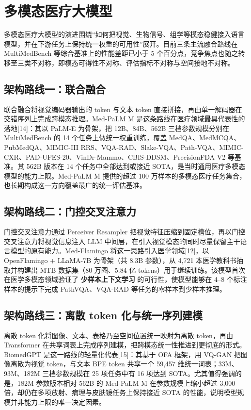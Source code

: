 \section{多模态医疗大模型}

多模态医疗大模型的演进围绕“如何把视觉、生物信号、组学等模态稳健接入语言模型，并在下游任务上保持统一权重的可用性”展开。目前三条主流融合路线在 MultiMedBench 等综合基准上的性能差距已小于 5 个百分点，竞争焦点也随之转移至三类不对称，即模态可得性不对称、评估指标不对称与空间接地不对称。

\subsection{架构路线一：联合融合}

联合融合将视觉编码器输出的 token 与文本 token 直接拼接，再由单一解码器在交错序列上完成跨模态推理。Med-PaLM M 是这条路线在医疗领域最具代表性的落地[14]：其以 PaLM-E 为骨架，把 12B、84B、562B 三档参数规模分别在 MultiMedBench 的 14 个任务上做统一权重训练，覆盖 MedQA、MedMCQA、PubMedQA、MIMIC-III RRS、VQA-RAD、Slake-VQA、Path-VQA、MIMIC-CXR、PAD-UFES-20、VinDr-Mammo、CBIS-DDSM、PrecisionFDA V2 等基准。其 562B 版本在 14 个任务中全部达到或接近 SOTA，是当时通用医疗多模态模型的能力上限。Med-PaLM M 提供的超过 100 万样本的多模态医疗任务集合，也长期构成这一方向覆盖最广的统一评估基准。

\subsection{架构路线二：门控交叉注意力}

门控交叉注意力通过 Perceiver Resampler 把视觉特征压缩到固定槽位，再以门控交叉注意力将视觉信息注入 LLM 中间层，在引入视觉模态的同时尽量保留主干语言模型的原有能力。Med-Flamingo 将这一思路引入医学领域[12]，以 OpenFlamingo + LLaMA-7B 为骨架（共 8.3B 参数），从 4,721 本医学教科书抽取并构建出 MTB 数据集（80 万图、5.84 亿 tokens）用于继续训练。该模型首次在医学多模态领域验证了 \textbf{少样本上下文学习} 的可行性，使模型能够在 4--8 个标注样本的提示下完成 PathVQA、VQA-RAD 等任务的零样本到少样本推理。

\subsection{架构路线三：离散 token 化与统一序列建模}

离散 token 化将图像、文本、表格乃至空间位置统一映射为离散 token，再由 Transformer 在共享词表上完成序列建模，把跨模态统一性推进到更彻底的形式。BiomedGPT 是这一路线的轻量化代表[15]：其基于 OFA 框架，用 VQ-GAN 把图像离散为视觉 token，与文本 BPE token 共享一个 59,457 维统一词表；33M、93M、182M 三档参数规模在 25 项任务中有 16 项达到 SOTA。尤其值得强调的是，182M 参数版本相对 562B 的 Med-PaLM M 在参数规模上缩小超过 3,000 倍，却仍在多项放射、病理与皮肤镜任务上保持接近 SOTA 的性能，说明模型规模并非能力上限的唯一决定因素。

